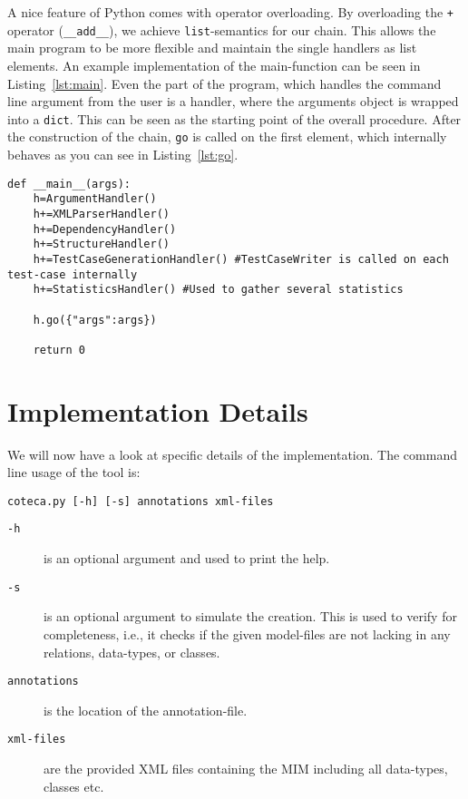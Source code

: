 A nice feature of Python comes with operator overloading. By overloading the \verb|+| operator (\verb|__add__|), we achieve \verb|list|-semantics for our chain. This allows the main program to be more flexible and maintain the single handlers as list elements. An example implementation
of the main-function can be seen in Listing~\ref{lst:main}. Even the part of the program, which handles the command line argument from the user is a handler, where the arguments object is wrapped into a \verb|dict|. This can be seen as the starting point of the overall procedure. After the construction of the chain, \verb|go| is called on the first element, which internally behaves as you can see in Listing~\ref{lst:go}.

\begin{lstlisting}[caption={The main program.}, label={lst:main},float,style=mypython]
def __main__(args):
	h=ArgumentHandler()
	h+=XMLParserHandler()
	h+=DependencyHandler()
	h+=StructureHandler()
	h+=TestCaseGenerationHandler() #TestCaseWriter is called on each test-case internally
	h+=StatisticsHandler() #Used to gather several statistics
	
	h.go({"args":args})
	
	return 0

\end{lstlisting}




\section{Implementation Details}\label{sec:impl}

We will now have a look at specific details of the implementation.
The command line usage of the tool is:
\begin{verbatim}
coteca.py [-h] [-s] annotations xml-files
\end{verbatim}

\begin{description}
 \item[\texttt{-h}] is an optional argument and used to print the help.
 \item[\texttt{-s}] is an optional argument to simulate the creation. This is used to verify for completeness, i.e., it checks if the given model-files are not lacking in any relations, data-types, or classes.
 \item[\texttt{annotations}] is the location of the annotation-file.
 \item[\texttt{xml-files}] are the provided XML files containing the MIM including all data-types, classes etc.
\end{description}

